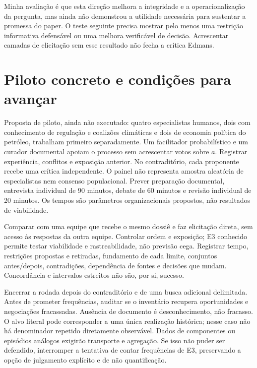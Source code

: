 \documentclass[
  brazilian,
  11pt,
  a4paper,
]{article}
\begin{document}
Minha avaliação é que esta direção melhora a integridade e a
operacionalização da pergunta, mas ainda não demonstrou a utilidade
necessária para sustentar a promessa do paper. O teste seguinte precisa
mostrar pelo menos uma restrição informativa defensável ou uma melhora
verificável de decisão. Acrescentar camadas de elicitação sem esse
resultado não fecha a crítica Edmans.

\section{Piloto concreto e condições para
avançar}\label{piloto-concreto-e-condiuxe7uxf5es-para-avanuxe7ar}

Proposta de piloto, ainda não executado: quatro especialistas humanos,
dois com conhecimento de regulação e coalizões climáticas e dois de
economia política do petróleo, trabalham primeiro separadamente. Um
facilitador probabilístico e um curador documental apoiam o processo sem
acrescentar votos sobre \(a\). Registrar experiência, conflitos e
exposição anterior. No contraditório, cada proponente recebe uma crítica
independente. O painel não representa amostra aleatória de especialistas
nem consenso populacional. Prever preparação documental, entrevista
individual de 90 minutos, debate de 60 minutos e revisão individual de
20 minutos. Os tempos são parâmetros organizacionais propostos, não
resultados de viabilidade.

Comparar com uma equipe que recebe o mesmo dossiê e faz elicitação
direta, sem acesso às respostas da outra equipe. Controlar ordem e
exposição; E3 conhecido permite testar viabilidade e rastreabilidade,
não previsão cega. Registrar tempo, restrições propostas e retiradas,
fundamento de cada limite, conjuntos antes/depois, contradições,
dependência de fontes e decisões que mudam. Concordância e intervalos
estreitos não são, por si, sucesso.

Encerrar a rodada depois do contraditório e de uma busca adicional
delimitada. Antes de prometer frequências, auditar se o inventário
recupera oportunidades e negociações fracassadas. Ausência de documento
é desconhecimento, não fracasso. O alvo literal pode corresponder a uma
única realização histórica; nesse caso não há denominador repetido
diretamente observável. Dados de componentes ou episódios análogos
exigirão transporte e agregação. Se isso não puder ser defendido,
interromper a tentativa de contar frequências de E3, preservando a opção
de julgamento explícito e de não quantificação.
\end{document}
